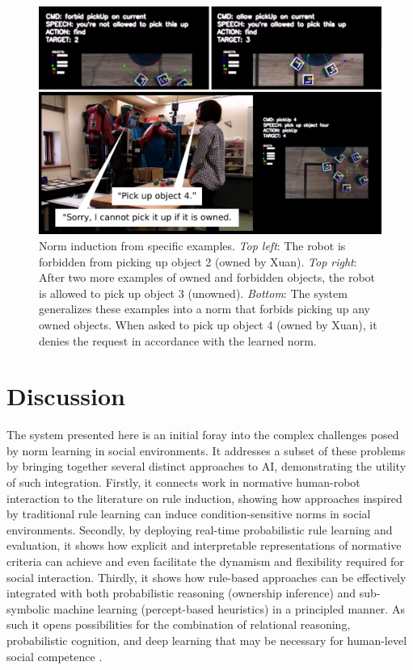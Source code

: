 \documentclass[letterpaper]{article} %
\begin{document}
\begin{figure}[t]
    \centering
    \includegraphics[width=\linewidth]{demo_2.pdf}
    \caption{Norm induction from specific examples. \emph{Top left}: The robot is forbidden from picking up object 2 (owned by Xuan). \emph{Top right}: After two more examples of owned and forbidden objects, the robot is allowed to pick up object 3 (unowned). \emph{Bottom}: The system generalizes these examples into a norm that forbids picking up any owned objects. When asked to pick up object 4 (owned by Xuan), it denies the request in accordance with the learned norm.}
    \label{fig:demo_2}
\end{figure}

\section{Discussion}

The system presented here is an initial foray into the complex challenges posed by norm learning in social environments. It addresses a subset of these problems by bringing together several distinct approaches to AI, demonstrating the utility of such integration. Firstly, it connects work in normative human-robot interaction to the literature on rule induction, showing how approaches inspired by traditional rule learning can induce condition-sensitive norms in social environments. Secondly, by deploying real-time probabilistic rule learning and evaluation, it shows how explicit and interpretable representations of normative criteria can achieve and even facilitate the dynamism and flexibility required for social interaction. Thirdly, it shows how rule-based approaches can be effectively integrated with both probabilistic reasoning (ownership inference) and sub-symbolic machine learning (percept-based heuristics) in a principled manner. As such it opens possibilities for the combination of relational reasoning, probabilistic cognition, and deep learning that may be necessary for human-level social competence \cite{tenenbaum2011grow,battaglia2018relational}.
\end{document}
